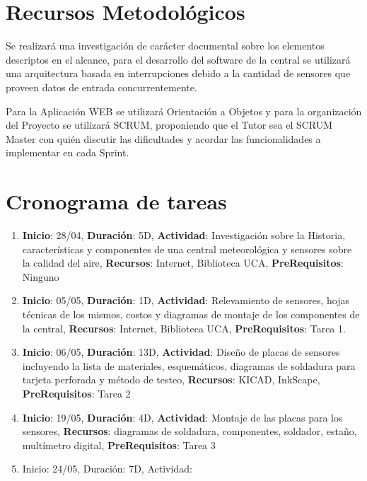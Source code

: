 \documentclass[a4paper,11pt, spanish]{article}
\begin{document}
\section{Recursos Metodológicos}
Se realizará una investigación de carácter documental sobre los elementos descriptos en el alcance, para el desarrollo del software de la central se utilizará una arquitectura basada en interrupciones debido a la cantidad de sensores que proveen datos de entrada concurrentemente.

Para la Aplicación WEB se utilizará Orientación a Objetos y para la organización del Proyecto se utilizará SCRUM, proponiendo que el Tutor sea el SCRUM Master con quién discutir las dificultades y acordar las funcionalidades a implementar en cada Sprint.  

\section{Cronograma de tareas}
\begin{enumerate}
\item \textbf{Inicio}: 28/04, \textbf{Duración}: 5D, \textbf{Actividad}: Investigación sobre la Historia, características y componentes de una central meteorológica y sensores sobre la calidad del aire, \textbf{Recursos}: Internet, Biblioteca UCA, \textbf{PreRequisitos}: Ninguno
\item \textbf{Inicio}: 05/05, \textbf{Duración}: 1D, \textbf{Actividad}: Relevamiento de sensores, hojas técnicas de los mismos, costos y diagramas de montaje de los componentes de la central, \textbf{Recursos}: Internet, Biblioteca UCA, \textbf{PreRequisitos}: Tarea 1.
\item \textbf{Inicio}: 06/05, \textbf{Duración}: 13D, \textbf{Actividad}: Diseño de placas de sensores incluyendo la lista de materiales, esquemáticos, diagramas de soldadura para tarjeta perforada y método de testeo, \textbf{Recursos}: KICAD, InkScape, \textbf{PreRequisitos}: Tarea 2
\item \textbf{Inicio}: 19/05, \textbf{Duración}: 4D, \textbf{Actividad}: Montaje de las placas para los sensores, \textbf{Recursos}: diagramas de soldadura, componentes, soldador, estaño, multímetro digital, \textbf{PreRequisitos}: Tarea 3
\item Inicio: 24/05, Duración: 7D, Actividad:  
\end{enumerate}
\end{document}
